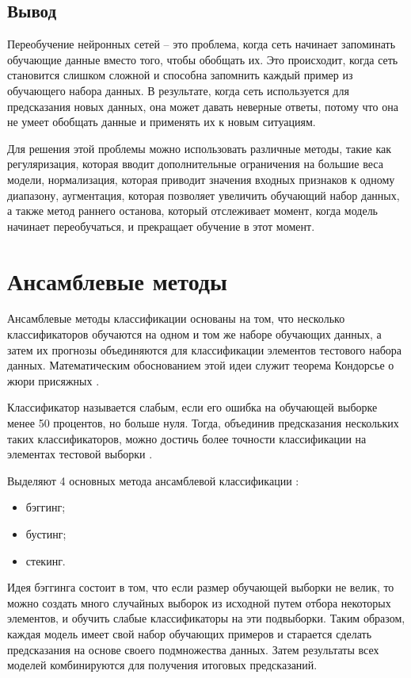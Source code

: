\subsection{Вывод}
Переобучение нейронных сетей -- это проблема, когда сеть начинает запоминать обучающие данные вместо того, чтобы обобщать их. Это происходит, когда сеть становится слишком сложной и способна запомнить каждый пример из обучающего набора данных. В результате, когда сеть используется для предсказания новых данных, она может давать неверные ответы, потому что она не умеет обобщать данные и применять их к новым ситуациям. 

Для решения этой проблемы можно использовать различные методы, такие как регуляризация, которая вводит дополнительные ограничения на большие веса модели, нормализация, которая приводит значения входных признаков к одному диапазону, аугментация, которая позволяет увеличить обучающий набор данных, а также метод раннего останова, который отслеживает момент, когда модель начинает переобучаться, и прекращает обучение в этот момент.


\section{Ансамблевые методы}
Ансамблевые методы классификации основаны на том, что несколько классификаторов обучаются на одном и том же наборе обучающих данных, а затем их прогнозы объединяются для классификации элементов тестового набора данных. Математическим обоснованием этой идеи служит теорема Кондорсье о жюри присяжных \cite{ansambles}.

Классификатор называется слабым, если его ошибка на обучающей выборке менее 50 процентов, но больше нуля. Тогда, объединив предсказания нескольких таких классификаторов, можно достичь более точности классификации на элементах тестовой выборки \cite{ansambles}.

Выделяют 4 основных метода ансамблевой классификации \cite{ansambles}:
\begin{itemize}
	\item бэггинг;
	\item бустинг;
	\item стекинг.
\end{itemize}

Идея бэггинга состоит в том, что если размер обучающей выборки не велик, то можно создать много случайных выборок из исходной путем отбора некоторых элементов, и обучить слабые классификаторы на эти подвыборки. Таким образом, каждая модель имеет свой набор обучающих примеров и старается сделать предсказания на основе своего подмножества данных. Затем результаты всех моделей комбинируются для получения итоговых предсказаний.


